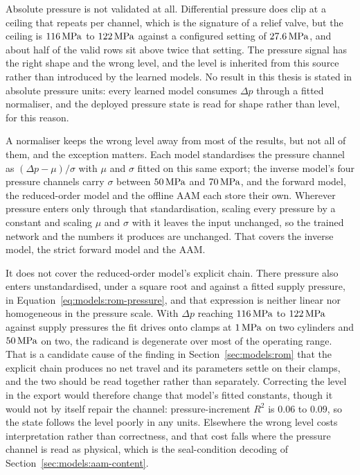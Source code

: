 Absolute pressure is not validated at all. Differential pressure does clip at a
ceiling that repeats per channel, which is the signature of a relief valve, but
the ceiling is $\unit[116]{MPa}$ to $\unit[122]{MPa}$ against a configured
setting of $\unit[27.6]{MPa}$, and about half of the valid rows sit above twice
that setting. The pressure signal has the right shape and the wrong level, and
the level is inherited from this source rather than introduced by the learned
models. No result in this thesis is stated in absolute pressure units: every
learned model consumes $\Delta p$ through a fitted normaliser, and the
deployed pressure state is read for shape rather than level, for this reason.

A normaliser keeps the wrong level away from most of the results, but not all of
them, and the exception matters. Each model standardises the pressure channel as
$(\Delta p - \mu)/\sigma$ with $\mu$ and $\sigma$ fitted on this same export;
the inverse model's four pressure channels carry $\sigma$ between
$\unit[50]{MPa}$ and $\unit[70]{MPa}$, and the forward model, the reduced-order
model and the offline AAM each store their own. Wherever pressure enters only
through that standardisation, scaling every pressure by a constant and scaling
$\mu$ and $\sigma$ with it leaves the input unchanged, so the trained network
and the numbers it produces are unchanged. That covers the inverse model, the
strict forward model and the AAM.

It does not cover the reduced-order model's explicit chain. There pressure also
enters unstandardised, under a square root and against a fitted supply pressure,
in Equation~\eqref{eq:models:rom-pressure}, and that expression is neither
linear nor homogeneous in the pressure scale. With $\Delta p$ reaching
$\unit[116]{MPa}$ to $\unit[122]{MPa}$ against supply pressures the fit drives
onto clamps at $\unit[1]{MPa}$ on two cylinders and $\unit[50]{MPa}$ on two,
the radicand is degenerate over most of the operating range. That is a candidate
cause of the finding in Section~\ref{sec:models:rom} that the explicit chain
produces no net travel and its parameters settle on their clamps, and the two
should be read together rather than separately. Correcting the level in the
export would therefore change that model's fitted constants, though it would not
by itself repair the channel: pressure-increment $R^2$ is $0.06$ to $0.09$, so
the state follows the level poorly in any units. Elsewhere the wrong level costs
interpretation rather than correctness, and that cost falls where the pressure
channel is read as physical, which is the seal-condition decoding of
Section~\ref{sec:models:aam-content}.

